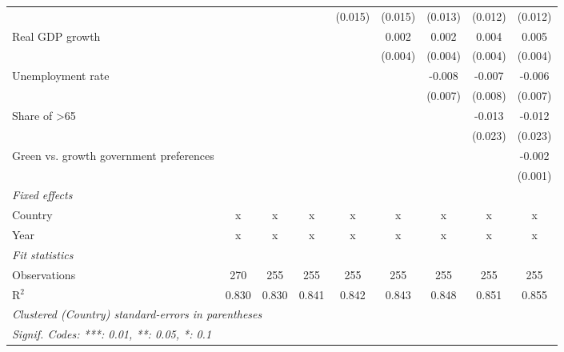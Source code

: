 \begin{table}[htbp]
\begin{tabular}{lcccccccc}
                                              &         &         &         & (0.015) & (0.015)     & (0.013) & (0.012)     & (0.012)\\   
      Real GDP growth                         &         &         &         &         & 0.002       & 0.002   & 0.004       & 0.005\\   
                                              &         &         &         &         & (0.004)     & (0.004) & (0.004)     & (0.004)\\   
      Unemployment rate                       &         &         &         &         &             & -0.008  & -0.007      & -0.006\\   
                                              &         &         &         &         &             & (0.007) & (0.008)     & (0.007)\\   
      Share of >65                            &         &         &         &         &             &         & -0.013      & -0.012\\   
                                              &         &         &         &         &             &         & (0.023)     & (0.023)\\   
      Green vs. growth government preferences &         &         &         &         &             &         &             & -0.002\\   
                                              &         &         &         &         &             &         &             & (0.001)\\   
      \emph{Fixed effects}\\
      Country                                 & x       & x       & x       & x       & x           & x       & x           & x\\  
      Year                                    & x       & x       & x       & x       & x           & x       & x           & x\\  
      \midrule \emph{Fit statistics}\\
      Observations                            & 270     & 255     & 255     & 255     & 255         & 255     & 255         & 255\\  
      R$^2$                                   & 0.830   & 0.830   & 0.841   & 0.842   & 0.843       & 0.848   & 0.851       & 0.855\\  
      \midrule
      \multicolumn{9}{l}{\emph{Clustered (Country) standard-errors in parentheses}}\\
      \multicolumn{9}{l}{\emph{Signif. Codes: ***: 0.01, **: 0.05, *: 0.1}}\\
   \end{tabular}
\end{table}


